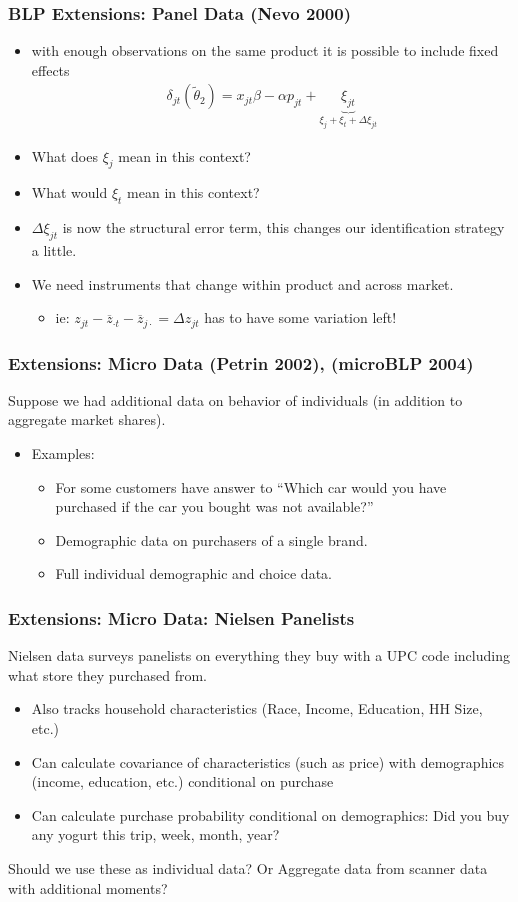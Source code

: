 \begin{frame}
\frametitle{BLP Extensions: Panel Data (Nevo 2000)}
\begin{itemize}
\item with enough observations on the same product it is possible to include fixed effects
\begin{eqnarray*}
\delta_{jt}(\widetilde{\theta}_2) = x_{jt} \beta - \alpha p_{jt} + \underbrace{\xi_{jt}}_{\xi_{j} + \xi_t + \Delta \xi_{jt}}
\end{eqnarray*}
\item What does $\xi_{j}$ mean in this context?
\item What would $\xi_t$ mean in this context?
\item $\Delta \xi_{jt}$ is now the structural error term, this changes our identification strategy a little.
\item We need instruments that change \alert{within product and across market}.
\begin{itemize}
\item ie: $z_{jt} - \overline{z}_{\cdot t} - \overline{z}_{j \cdot } = \Delta z_{jt}$ has to have some variation left!
\end{itemize}
\end{itemize}
\end{frame}


\begin{frame}
\frametitle{Extensions: Micro Data (Petrin 2002), (microBLP 2004)}
Suppose we had additional data on behavior of individuals (in addition to aggregate market shares).
\begin{itemize}
\item Examples:
\begin{itemize}
\item For some customers have answer to ``Which car would you have purchased if the car you bought was not available?''
\item Demographic data on purchasers of a single brand.
\item Full individual demographic and choice data.
\end{itemize}
\end{itemize}
\end{frame}

\begin{frame}
\frametitle{Extensions: Micro Data: Nielsen Panelists}
Nielsen data surveys panelists on everything they buy with a UPC code including what store they purchased from.
\begin{itemize}
\item Also tracks household characteristics (Race, Income, Education, HH Size, etc.)
\item Can calculate covariance of characteristics (such as price) with demographics (income, education, etc.) \alert{conditional on purchase}
\item Can calculate purchase probability conditional on demographics: Did you buy any yogurt this trip, week, month, year?
\end{itemize}
Should we use these as individual data? Or Aggregate data from scanner data with additional moments?
\end{frame}


